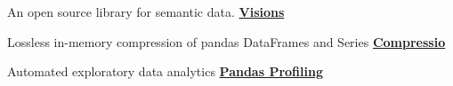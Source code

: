 \begin{cventries}
  \cventry
    {An open source library for semantic data.}
    {\href{https://github.com/dylan-profiler/visions}{\textbf{Visions}}}
    {}
    {}
    {}

  \cventry
    {Lossless in-memory compression of pandas DataFrames and Series}
    {\href{https://github.com/dylan-profiler/compressio}{\textbf{Compressio}}}
    {}
    {}
    {}

  \cventry
    {Automated exploratory data analytics}
    {\href{https://github.com/pandas-profiling/pandas-profiling}{\textbf{Pandas Profiling}}}
    {}
    {}
    {}

\end{cventries}

